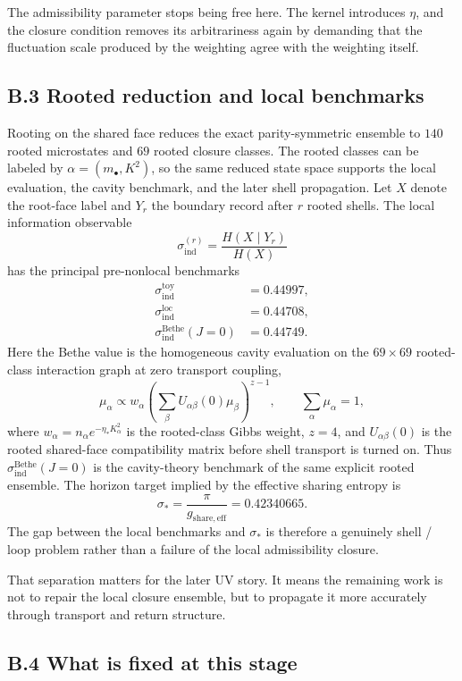 \documentclass[11pt]{article}
\begin{document}
The admissibility parameter stops being free here. The kernel introduces $\eta$, and the closure condition removes its arbitrariness again by demanding that the fluctuation scale produced by the weighting agree with the weighting itself.

\subsection*{B.3 Rooted reduction and local benchmarks}

Rooting on the shared face reduces the exact parity-symmetric ensemble to $140$ rooted microstates and $69$ rooted closure classes. The rooted classes can be labeled by $\alpha=(m_\bullet,K^2)$, so the same reduced state space supports the local evaluation, the cavity benchmark, and the later shell propagation. Let $X$ denote the root-face label and $Y_r$ the boundary record after $r$ rooted shells. The local information observable
\[
\sigma_{\mathrm{ind}}^{(r)}=\frac{H(X\mid Y_r)}{H(X)}
\]
has the principal pre-nonlocal benchmarks
\begin{align}
\sigma_{\mathrm{ind}}^{\mathrm{toy}} &= 0.44997,\\
\sigma_{\mathrm{ind}}^{\mathrm{loc}} &= 0.44708,\\
\sigma_{\mathrm{ind}}^{\mathrm{Bethe}}(J=0) &= 0.44749.
\end{align}
Here the Bethe value is the homogeneous cavity evaluation on the $69\times 69$ rooted-class interaction graph at zero transport coupling,
\[
\mu_\alpha
\propto
w_\alpha
\left(\sum_\beta U_{\alpha\beta}(0)\mu_\beta\right)^{z-1},
\qquad
\sum_\alpha \mu_\alpha=1,
\]
where $w_\alpha=n_\alpha e^{-\eta_*K_\alpha^2}$ is the rooted-class Gibbs weight, $z=4$, and $U_{\alpha\beta}(0)$ is the rooted shared-face compatibility matrix before shell transport is turned on. Thus $\sigma_{\mathrm{ind}}^{\mathrm{Bethe}}(J=0)$ is the cavity-theory benchmark of the same explicit rooted ensemble.
The horizon target implied by the effective sharing entropy is
\[
\sigma_*=\frac{\pi}{g_{\mathrm{share,eff}}}=0.42340665.
\]
The gap between the local benchmarks and $\sigma_*$ is therefore a genuinely shell / loop problem rather than a failure of the local admissibility closure.

That separation matters for the later UV story. It means the remaining work is not to repair the local closure ensemble, but to propagate it more accurately through transport and return structure.

\subsection*{B.4 What is fixed at this stage}
\end{document}
